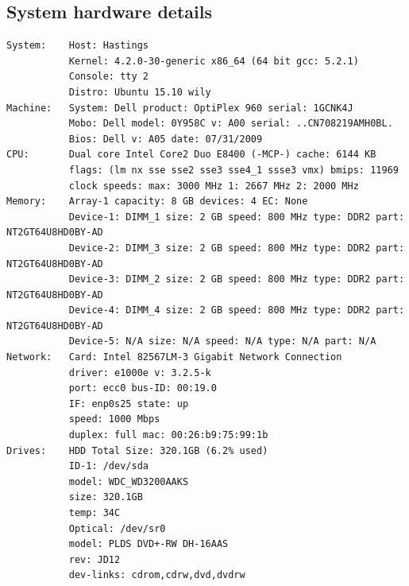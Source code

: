 \subsection{System hardware details}
\label{sub:system-specs}
\begin{lstlisting}[language={}]
System:    Host: Hastings
           Kernel: 4.2.0-30-generic x86_64 (64 bit gcc: 5.2.1)
           Console: tty 2
           Distro: Ubuntu 15.10 wily
Machine:   System: Dell product: OptiPlex 960 serial: 1GCNK4J
           Mobo: Dell model: 0Y958C v: A00 serial: ..CN708219AMH0BL.
           Bios: Dell v: A05 date: 07/31/2009
CPU:       Dual core Intel Core2 Duo E8400 (-MCP-) cache: 6144 KB
           flags: (lm nx sse sse2 sse3 sse4_1 ssse3 vmx) bmips: 11969
           clock speeds: max: 3000 MHz 1: 2667 MHz 2: 2000 MHz
Memory:    Array-1 capacity: 8 GB devices: 4 EC: None
           Device-1: DIMM_1 size: 2 GB speed: 800 MHz type: DDR2 part: NT2GT64U8HD0BY-AD
           Device-2: DIMM_3 size: 2 GB speed: 800 MHz type: DDR2 part: NT2GT64U8HD0BY-AD
           Device-3: DIMM_2 size: 2 GB speed: 800 MHz type: DDR2 part: NT2GT64U8HD0BY-AD
           Device-4: DIMM_4 size: 2 GB speed: 800 MHz type: DDR2 part: NT2GT64U8HD0BY-AD
           Device-5: N/A size: N/A speed: N/A type: N/A part: N/A
Network:   Card: Intel 82567LM-3 Gigabit Network Connection
           driver: e1000e v: 3.2.5-k
           port: ecc0 bus-ID: 00:19.0
           IF: enp0s25 state: up
           speed: 1000 Mbps
           duplex: full mac: 00:26:b9:75:99:1b
Drives:    HDD Total Size: 320.1GB (6.2% used)
           ID-1: /dev/sda
           model: WDC_WD3200AAKS
           size: 320.1GB
           temp: 34C
           Optical: /dev/sr0
           model: PLDS DVD+-RW DH-16AAS
           rev: JD12
           dev-links: cdrom,cdrw,dvd,dvdrw

\end{lstlisting}

